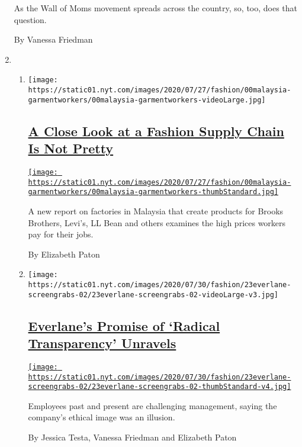 \begin{enumerate}
  As the Wall of Moms movement spreads across the country, so, too, does
  that question.

  By Vanessa Friedman
\item
  \begin{enumerate}
  \def\labelenumii{\arabic{enumii}.}
  \item
    \texttt{[image: https://static01.nyt.com/images/2020/07/27/fashion/00malaysia-garmentworkers/00malaysia-garmentworkers-videoLarge.jpg]}

    \hypertarget{a-close-look-at-a-fashion-supply-chain-is-not-pretty}{%
    \subsection{\texorpdfstring{\href{/2020/07/28/style/malaysia-forced-labor-garment-workers.html}{A
    Close Look at a Fashion Supply Chain Is Not
    Pretty}}{A Close Look at a Fashion Supply Chain Is Not Pretty}}\label{a-close-look-at-a-fashion-supply-chain-is-not-pretty}}

    \href{/2020/07/28/style/malaysia-forced-labor-garment-workers.html}{\texttt{[image: https://static01.nyt.com/images/2020/07/27/fashion/00malaysia-garmentworkers/00malaysia-garmentworkers-thumbStandard.jpg]}}

    A new report on factories in Malaysia that create products for
    Brooks Brothers, Levi's, LL Bean and others examines the high prices
    workers pay for their jobs.

    By Elizabeth Paton
  \item
    \texttt{[image: https://static01.nyt.com/images/2020/07/30/fashion/23everlane-screengrabs-02/23everlane-screengrabs-02-videoLarge-v3.jpg]}

    \hypertarget{everlanes-promise-of-radical-transparency-unravels}{%
    \subsection{\texorpdfstring{\href{/2020/07/26/fashion/everlane-employees-ethical-clothing.html}{Everlane's
    Promise of `Radical Transparency'
    Unravels}}{Everlane's Promise of `Radical Transparency' Unravels}}\label{everlanes-promise-of-radical-transparency-unravels}}

    \href{/2020/07/26/fashion/everlane-employees-ethical-clothing.html}{\texttt{[image: https://static01.nyt.com/images/2020/07/30/fashion/23everlane-screengrabs-02/23everlane-screengrabs-02-thumbStandard-v4.jpg]}}

    Employees past and present are challenging management, saying the
    company's ethical image was an illusion.

    By Jessica Testa, Vanessa Friedman and Elizabeth Paton
  \end{enumerate}
\end{enumerate}

